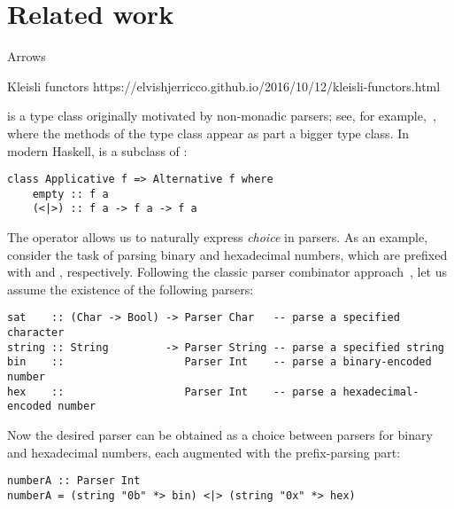 \section{Related work}\label{sec-related}

Arrows

Kleisli functors
https://elvishjerricco.github.io/2016/10/12/kleisli-functors.html

 is a type class originally motivated by non-monadic parsers;
see, for example,~\citet{swierstra1996parsers}, where the methods of the
 type class appear as part a bigger  type class. In
modern Haskell,  is a subclass of :

\vspace{1mm}
\begin{verbatim}
class Applicative f => Alternative f where
    empty :: f a
    (<|>) :: f a -> f a -> f a
\end{verbatim}
\vspace{1mm}

\noindent
The operator \hs{<|>} allows us to naturally express \emph{choice} in parsers.
As an example, consider the task of parsing binary and hexadecimal numbers,
which are prefixed with  and , respectively. Following the
classic parser combinator approach~\citep{hutton1998monadic}, let us assume the
existence of the following parsers:

\vspace{1mm}
\begin{verbatim}
sat    :: (Char -> Bool) -> Parser Char   -- parse a specified character
string :: String         -> Parser String -- parse a specified string
bin    ::                   Parser Int    -- parse a binary-encoded number
hex    ::                   Parser Int    -- parse a hexadecimal-encoded number
\end{verbatim}
\vspace{1mm}

\noindent
Now the desired parser can be obtained as a choice between parsers for binary
and hexadecimal numbers, each augmented with the prefix-parsing part:

\vspace{1mm}
\begin{verbatim}
numberA :: Parser Int
numberA = (string "0b" *> bin) <|> (string "0x" *> hex)
\end{verbatim}
\vspace{1mm}

